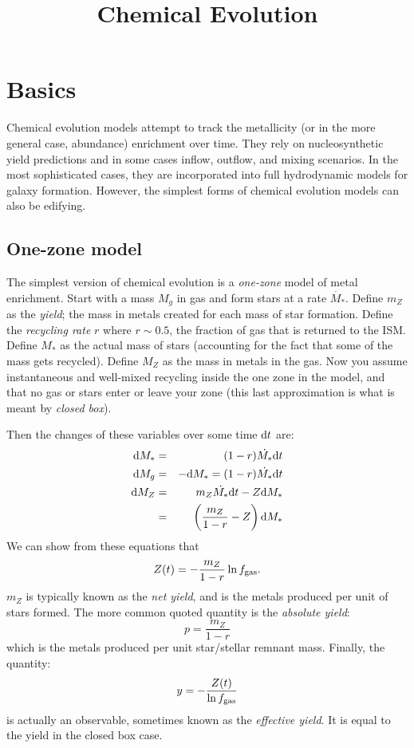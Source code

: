 \title{\bf Chemical Evolution}

\section{Basics}

Chemical evolution models attempt to track the metallicity (or in the
more general case, abundance) enrichment over time. They rely on
nucleosynthetic yield predictions and in some cases inflow, outflow,
and mixing scenarios. In the most sophisticated cases, they are
incorporated into full hydrodynamic models for galaxy
formation. However, the simplest forms of chemical evolution models
can also be edifying.

\subsection{One-zone model}

The simplest version of chemical evolution is a {\it one-zone} model
of metal enrichment. Start with a mass $M_g$ in gas and form stars at
a rate $\dot{M_\ast}$. Define $m_Z$ as the {\it yield}; the mass in
metals created for each mass of star formation. Define the {\it
recycling rate} $r$ where $r\sim 0.5$, the fraction of gas that is
returned to the ISM. Define $M_\ast$ as the actual mass of stars
(accounting for the fact that some of the mass gets recycled).  Define
$M_Z$ as the mass in metals in the gas.  Now you assume instantaneous
and well-mixed recycling inside the one zone in the model, and that no
gas or stars enter or leave your zone (this last approximation is what
is meant by {\it closed box}).

Then the changes of these variables over some time ${\rm d}t$ are:
\begin{eqnarray}
{\rm d}M_\ast &=& (1-r) \dot{M_\ast} {\rm d}t \cr
{\rm d}M_g &=& - {\rm d}M_\ast = (1-r) \dot{M_\ast} {\rm d}t \cr
{\rm d}M_Z &=& m_Z \dot{M_\ast} {\rm d}t - Z {\rm d}M_\ast \cr
&=& \left(\frac{m_Z}{1-r} - Z\right) {\rm d}M_\ast
\end{eqnarray}
We can show from these equations that
\begin{equation}
\label{eq:closedz}
Z(t) = - \frac{m_Z}{1-r} \ln f_{\rm gas}.
\end{equation}
$m_Z$ is typically known as the {\it net yield},
and is the metals produced per unit of stars formed. The more common
quoted quantity is the {\it absolute yield}:
\begin{equation}
p = \frac{m_Z}{1-r}
\end{equation}
which is the metals produced per unit star/stellar remnant mass.
Finally, the quantity:
\begin{equation}
y = -\frac{Z(t)}{\ln f_{\rm gas}}
\end{equation}
is actually an observable, sometimes known as the {\it effective
yield}. It is equal to the yield in the closed box case. 

